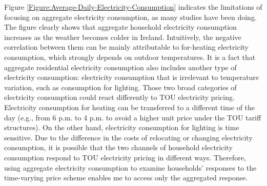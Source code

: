 Figure \ref{Figure:Average-Daily-Electricity-Consumption} indicates the limitations of focusing on aggregate electricity consumption, as many studies have been doing. The figure clearly shows that aggregate household electricity consumption increases as the weather becomes colder in Ireland. Intuitively, the negative correlation between them can be mainly attributable to for-heating electricity consumption, which strongly depends on outdoor temperatures. It is a fact that aggregate residential electricity consumption also includes another type of electricity consumption: electricity consumption that is irrelevant to temperature variation, such as consumption for lighting. Those two broad categories of electricity consumption could react differently to TOU electricity pricing. Electricity consumption for heating can be transferred to a different time of the day (e.g., from 6 p.m. to 4 p.m. to avoid a higher unit price under the TOU tariff structures). On the other hand, electricity consumption for lighting is time sensitive. Due to the difference in the costs of relocating or changing electricity consumption, it is possible that the two channels of household electricity consumption respond to TOU electricity pricing in different ways. Therefore, using aggregate electricity consumption to examine households' responses to the time-varying price scheme enables me to access only the aggregated response. 

